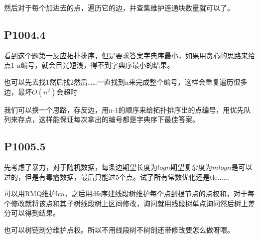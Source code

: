 \documentclass[UTF8]{ctexart}
\begin{document}
	然后对于每个加进去的点，遍历它的边，并查集维护连通块数量就可以了。
	
	\subsection*{P1004.4}
	看到这个题第一反应拓扑排序，但是要求答案字典序最小，如果用贪心的思路来给点1-n编号，就会目光短浅，得不到字典序最小的结果。
	
	也可以先去找1然后找2然后……一直找到n来完成整个编号，这样会重复遍历很多边，最坏$O(n^2)$会超时
	
	我们可以换一个思路，存反边，用n-1的顺序来给拓扑排序出的点编号，用优先队列来存点，这样能保证每次拿出的编号都是字典序下最佳答案。
	\subsection*{P1005.5}
	先考虑了暴力，对于随机数据，每条边期望长度为$logn$期望复杂度为$mlogn$是可以过的，但是有毒瘤数据，最后只能过5个点。试了所有常数优化还是tle......
	
	可以用RMQ维护lca，之后用dfs序建线段树维护每个点到根节点的点权和，对于每个修改就将该点和其子树线段树上区间修改，询问就用线段树单点询问然后树上差分可以得到结果。
	
	也可以树链剖分维护点权。所以不用线段树不树剖还带修改要怎么做呀喂。
\end{document}
